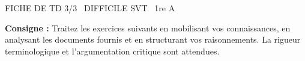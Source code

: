 \documentclass[11pt]{article}
\begin{document}
\begin{tcolorbox}[enhanced,colback=popink,colframe=popink,arc=10pt,boxrule=0pt,left=12pt,right=12pt,top=9pt,bottom=9pt]
{\color{white}\popxbold\small FICHE DE TD 3/3 \textbullet\ DIFFICILE \hfill SVT \textbullet\ 1re A\par}
\end{tcolorbox}
\vspace{4pt}
\noindent \textbf{Consigne :} Traitez les exercices suivants en mobilisant vos connaissances, en analysant les documents fournis et en structurant vos raisonnements. La rigueur terminologique et l'argumentation critique sont attendues.
\end{document}
